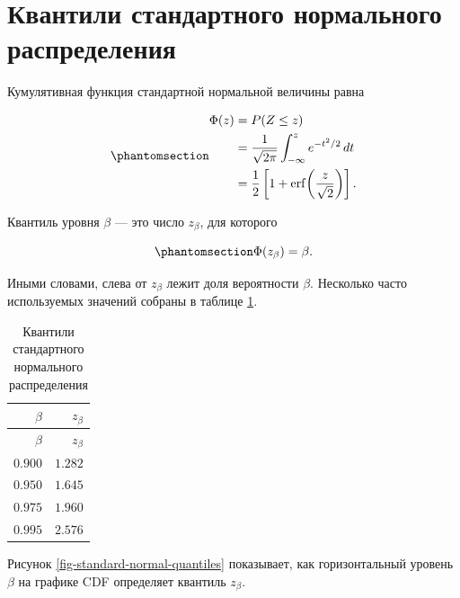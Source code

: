 \documentclass[
  russian,
  11pt,
  a4paper,
  open=any]{scrbook}
\begin{document}
\section{Квантили стандартного нормального
распределения}\label{ux43aux432ux430ux43dux442ux438ux43bux438-ux441ux442ux430ux43dux434ux430ux440ux442ux43dux43eux433ux43e-ux43dux43eux440ux43cux430ux43bux44cux43dux43eux433ux43e-ux440ux430ux441ux43fux440ux435ux434ux435ux43bux435ux43dux438ux44f}

Кумулятивная функция стандартной нормальной величины равна

\begin{equation}\protect\phantomsection\label{eq-standard-normal-cdf}{
\begin{aligned}
\Phi(z)
&=P(Z\le z)\\
&=\frac{1}{\sqrt{2\pi}}
\int_{-\infty}^{z}e^{-t^2/2}\,dt\\
&=\frac12\left[1+\operatorname{erf}\!\left(\frac{z}{\sqrt2}\right)\right].
\end{aligned}
}\end{equation}

Квантиль уровня \(\beta\) --- это число \(z_\beta\), для которого

\begin{equation}\protect\phantomsection\label{eq-standard-normal-quantile}{
\Phi(z_\beta)=\beta.
}\end{equation}

Иными словами, слева от \(z_\beta\) лежит доля вероятности \(\beta\).
Несколько часто используемых значений собраны в таблице
\ref{tbl-standard-normal-quantiles}.

\begin{longtable}[]{@{}rr@{}}
\caption{Квантили стандартного нормального
распределения}\label{tbl-standard-normal-quantiles}\tabularnewline
\toprule\noalign{}
\(\beta\) & \(z_\beta\) \\
\midrule\noalign{}
\endfirsthead
\toprule\noalign{}
\(\beta\) & \(z_\beta\) \\
\midrule\noalign{}
\endhead
\bottomrule\noalign{}
\endlastfoot
\(0.900\) & \(1.282\) \\
\(0.950\) & \(1.645\) \\
\(0.975\) & \(1.960\) \\
\(0.995\) & \(2.576\) \\
\end{longtable}

Рисунок \ref{fig-standard-normal-quantiles} показывает, как
горизонтальный уровень \(\beta\) на графике CDF определяет квантиль
\(z_\beta\).
\end{document}
